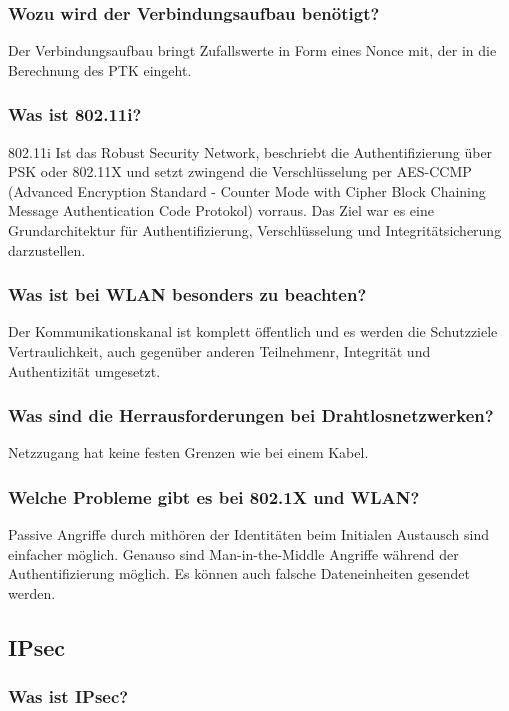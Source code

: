 	\subsubsection{Wozu wird der Verbindungsaufbau benötigt?}
	Der Verbindungsaufbau bringt Zufallswerte in Form eines Nonce mit, der in die Berechnung des PTK eingeht.	
		
		
	\subsubsection{Was ist 802.11i?}
	802.11i Ist das Robust Security Network, beschriebt die Authentifizierung über PSK oder 802.11X und setzt zwingend die Verschlüsselung per AES-CCMP (Advanced Encryption Standard - Counter Mode with Cipher Block Chaining Message Authentication Code Protokol) vorraus. Das Ziel war es eine Grundarchitektur für Authentifizierung, Verschlüsselung und Integritätsicherung darzustellen. 
	
	\subsubsection{Was ist bei WLAN besonders zu beachten?}
	Der Kommunikationskanal ist komplett öffentlich und es werden die Schutzziele Vertraulichkeit, auch gegenüber anderen Teilnehmenr, Integrität und Authentizität umgesetzt.
	
	\subsubsection{Was sind die Herrausforderungen bei Drahtlosnetzwerken?}
	Netzzugang hat keine festen Grenzen wie bei einem Kabel.
	
	\subsubsection{Welche Probleme gibt es bei 802.1X und WLAN?}
	Passive Angriffe durch mithören der Identitäten beim Initialen Austausch sind einfacher möglich. Genauso sind Man-in-the-Middle Angriffe während der Authentifizierung möglich. Es können auch falsche Dateneinheiten gesendet werden.
	
		\subsection{IPsec}
		

	
	\subsubsection{Was ist IPsec?}

